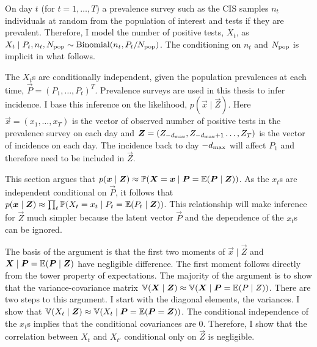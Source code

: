 \documentclass[thesis.tex]{subfiles}
\begin{document}
On day $t$ (for $t = 1, \dots, T$) a prevalence survey such as the CIS samples $n_t$ individuals at random from the population of interest and tests if they are prevalent.
Therefore, I model the number of positive tests, $X_t$, as $X_t \mid P_t, n_t, N_\text{pop} \sim \operatorname{Binomial}(n_t, P_t/N_\text{pop})$.
The conditioning on $n_t$ and $N_\text{pop}$ is implicit in what follows.

The $X_t$s are conditionally independent, given the population prevalences at each time, $\vec{P} = (P_1, \dots, P_t)^T$. 
Prevalence surveys are used in this thesis to infer incidence.
I base this inference on the likelihood, $p(\vec{x} \mid \vec{Z})$.%
Here $\vec{x} = (x_1, \dots, x_T)$ is the vector of observed number of positive tests in the prevalence survey on each day and $\bm{Z} = (Z_{-d_\text{max}}, Z_{-d_\text{max}+1} \dots, Z_T)$ is the vector of incidence on each day.
The incidence back to day $-d_\text{max}$ will affect $P_1$ and therefore need to be included in $\vec{Z}$. 

This section argues that $p(\bm{x} \mid \bm{Z}) \approx \operatorname{\mathbb{P}}(\bm{X} = \bm{x} \mid \bm{P} = \operatorname{\mathbb{E}}(\bm{P} \mid \bm{Z}))$.
As the $x_t$s are independent conditional on $\vec{P}$, it follows that $p(\bm{x} \mid \bm{Z}) \approx \prod_t \operatorname{\mathbb{P}}(X_t = x_t \mid P_t = \operatorname{\mathbb{E}}(P_t \mid \bm{Z}))$.
This relationship will make inference for $\vec{Z}$ much simpler because the latent vector $\vec{P}$ and the dependence of the $x_t$s can be ignored.

The basis of the argument is that the first two moments of $\vec{x} \mid \vec{Z}$ and $\bm{X} \mid \bm{P} = \operatorname{\mathbb{E}}(\bm{P} \mid \bm{Z})$ have negligible difference.
The first moment follows directly from the tower property of expectations.
The majority of the argument is to show that the variance-covariance matrix $\operatorname{\mathbb{V}}(\bm{X} \mid \bm{Z}) \approx \operatorname{\mathbb{V}}(\bm{X} \mid \bm{P} = \operatorname{\mathbb{E}}(P \mid Z))$.
There are two steps to this argument.
I start with the diagonal elements, the variances.
I show that $\operatorname{\mathbb{V}}(X_t \mid \bm{Z}) \approx \operatorname{\mathbb{V}}(X_t \mid \bm{P} = \operatorname{\mathbb{E}}(\bm{P} = \bm{Z}))$.
The conditional independence of the $x_t$s implies that the conditional covariances are 0.
Therefore, I show that the correlation between $X_t$ and $X_{t'}$ conditional only on $\vec{Z}$ is negligible.
\end{document}
